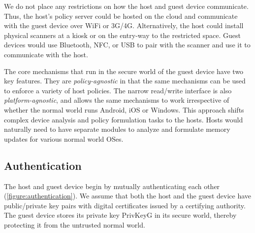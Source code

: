 \documentclass[pageno]{sig-alternate-05-2015}
\newcommand{\figref}[1]{\autoref{#1}}
\begin{document}
We do not place any restrictions on how the host and guest device communicate.
Thus, the host's policy server could be hosted on the cloud and communicate
with the guest device over WiFi or 3G/4G. Alternatively, the host could install
physical scanners at a kiosk or on the entry-way to the restricted space.  Guest
devices would use Bluetooth, NFC, or USB to pair with the scanner and use it to
communicate with the host.

The core mechanisms that run in the secure world of the guest device have two
key features. They are \textit{policy-agnostic} in that the same mechanisms can
be used to enforce a variety of host policies. The narrow read/write interface
is also \textit{platform-agnostic}, and allows the same mechanisms to work
irrespective of whether the normal world runs Android, iOS or Windows. This
approach shifts complex device analysis and policy formulation tasks to the
hosts. Hosts would naturally need to have separate modules to analyze and
formulate memory updates for various normal world OSes.

\subsection{Authentication}
\label{section:mechanism:auth}
\newcommand{\ks}{$k_s$}
\newcommand{\pub}[1]{{\sf PubKey#1}}
\newcommand{\prv}[1]{{\sf PrivKey#1}}
\newcommand{\enc}[2]{\textsf{Enc}$_{#1}$(#2)}
\newcommand{\cert}[1]{\textsf{Certificate}(#1)}

The host and guest device begin by mutually authenticating each other
(\figref{figure:authentication}). We assume that both the host and the guest
device have public/private key pairs with digital certificates issued by a
certifying authority. The guest device stores its private key \prv{G} in its
secure world, thereby protecting it from the untrusted normal world. 
\end{document}
